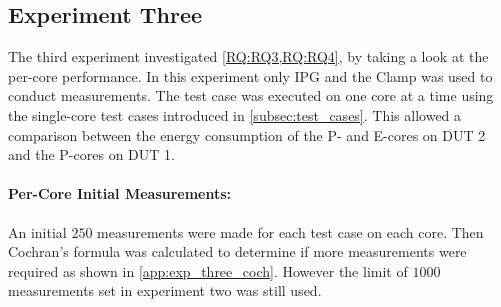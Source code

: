 \subsection{Experiment Three}\label{subsec:exp_three}

The third experiment investigated \cref{RQ:RQ3,RQ:RQ4}, by taking a look at the per-core performance. In this experiment only IPG and the Clamp was used to conduct measurements. The test case was executed on one core at a time using the single-core test cases introduced in \cref{subsec:test_cases}. This allowed a comparison between the energy consumption of the P- and E-cores on DUT 2 and the P-cores on DUT 1.


\paragraph{Per-Core Initial Measurements:} An initial $250$ measurements were made for each test case on each core. Then Cochran's formula was calculated to determine if more measurements were required as shown in \cref{app:exp_three_coch}. However the limit of $1000$ measurements set in experiment two was still used.


